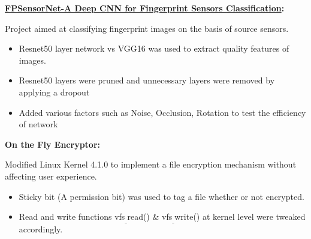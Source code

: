 \documentclass[11pt, a4paper]{article}
\newcommand{\resumeNewItem}[3]{
  \item\small{
    \textbf{#1:}{\hfill \vspace{3pt}{#2}\\}{ #3\vspace{-5pt}}
  }
}
\newcommand{\resumeNewSubItem}[3]{\resumeNewItem{#1}{#2}{#3}\vspace{-8pt}}
\begin{document}
    \resumeNewSubItem{\href{https://github.com/deepakks1995/Fingerprint_Sensor_Classification}{FPSensorNet-A Deep CNN for Fingerprint Sensors Classification}}{(Mar 2017 - May 2017), IIT Mandi}{
        Project aimed at classifying fingerprint images on the basis of source sensors.
        \begin{itemize} 
            \vspace{-6pt}
          \item Resnet50 layer network vs VGG16 was used to extract quality features of images.
          \vspace{-3pt}
          \item Resnet50 layers were pruned and unnecessary layers were removed by applying a dropout 
          \vspace{-3pt}
          \item Added various factors such as Noise, Occlusion, Rotation to test the efficiency of network
        \end{itemize}
        
    }
    \vspace{6pt}
    \resumeNewSubItem{On the Fly Encryptor}{ VI Semester, IIT Mandi}{
        Modified Linux Kernel 4.1.0 to implement a file encryption mechanism without affecting user experience. 
        \begin{itemize} 
            \vspace{-6pt}
          \item Sticky bit (A permission bit) was used to tag a file whether or not encrypted.
          \vspace{-3pt}
          \item Read and write functions vfs$_{\_}$read() \& vfs$_{\_}$write()  at kernel level were tweaked accordingly.
           \end{itemize}
       
    }
    \vspace{6pt}
\end{document}
